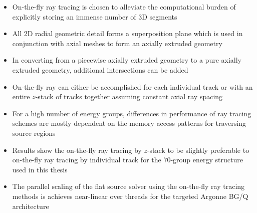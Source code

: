 \newpage
\vfill
\begin{highlightsbox}[frametitle=Highlights]
\begin{itemize}
 
 \item On-the-fly ray tracing is chosen to alleviate the computational burden of explicitly storing an immense number of 3D segments

 \item All 2D radial geometric detail forms a superposition plane which is used in conjunction with axial meshes to form an axially extruded geometry
 
 \item In converting from a piecewise axially extruded geometry to a pure axially extruded geometry, additional intersections can be added

 \item On-the-fly ray can either be accomplished for each individual track or with an entire $z$-stack of tracks together assuming constant axial ray spacing
 
 \item For a high number of energy groups, differences in performance of ray tracing schemes are mostly dependent on the memory access patterns for traversing source regions

 \item Results show the on-the-fly ray tracing by $z$-stack to be slightly preferable to on-the-fly ray tracing by individual track for the 70-group energy structure used in this thesis

 \item The parallel scaling of the flat source solver using the on-the-fly ray tracing methods is achieves near-linear over threads for the targeted Argonne BG/Q architecture
 
\end{itemize}
\end{highlightsbox}
\vfill